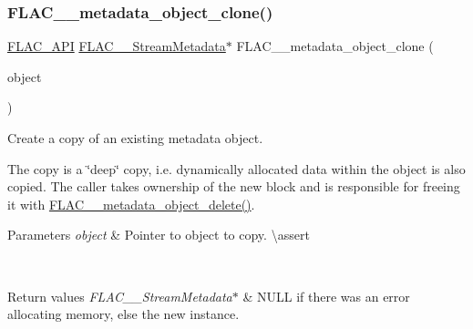 \subsubsection{\texorpdfstring{FLAC\_\_metadata\_object\_clone()}{FLAC\_\_metadata\_object\_clone()}}
{\footnotesize\ttfamily \mbox{\hyperlink{group__flac__export_ga56ca07df8a23310707732b1c0007d6f5}{F\+L\+A\+C\+\_\+\+A\+PI}} \mbox{\hyperlink{struct_f_l_a_c_____stream_metadata}{F\+L\+A\+C\+\_\+\+\_\+\+Stream\+Metadata}}$\ast$ F\+L\+A\+C\+\_\+\+\_\+metadata\+\_\+object\+\_\+clone (\begin{DoxyParamCaption}\item[{const \mbox{\hyperlink{struct_f_l_a_c_____stream_metadata}{F\+L\+A\+C\+\_\+\+\_\+\+Stream\+Metadata}} $\ast$}]{object }\end{DoxyParamCaption})}

Create a copy of an existing metadata object.

The copy is a \char`\"{}deep\char`\"{} copy, i.\+e. dynamically allocated data within the object is also copied. The caller takes ownership of the new block and is responsible for freeing it with \mbox{\hyperlink{group__flac__metadata__object_ga66bbe27dba68ba77be5af83986a280ea}{F\+L\+A\+C\+\_\+\+\_\+metadata\+\_\+object\+\_\+delete()}}.


\begin{DoxyParams}{Parameters}
{\em object} & Pointer to object to copy. \textbackslash{}assert 
\begin{DoxyCode}{1}
\end{DoxyCode}
 \\
\hline
\end{DoxyParams}

\begin{DoxyRetVals}{Return values}
{\em F\+L\+A\+C\+\_\+\+\_\+\+Stream\+Metadata$\ast$} & {\ttfamily N\+U\+LL} if there was an error allocating memory, else the new instance. \\
\hline
\end{DoxyRetVals}
\mbox{\label{group__flac__metadata__object_ga897138ca0a985d8741f73d6657f38845}} 

